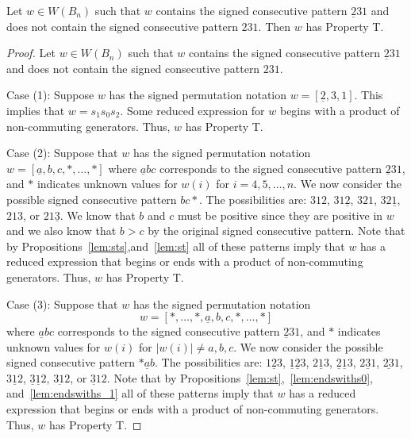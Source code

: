 \begin{proposition}\label{lem:231}
Let $w \in W(B_n)$ such that $w$ contains the signed consecutive pattern $\underline{2}31$ and does not contain the signed consecutive pattern $231$. Then $w$ has Property T.
\begin{proof}
	Let $w \in W(B_n)$ such that $w$ contains the signed consecutive pattern $\underline{2}31$ and does not contain the signed consecutive pattern $231$.
	
	Case (1): Suppose $w$ has the signed permutation notation $w=[\underline{2},3,1]$. This implies that $w=s_1s_0s_2$. Some reduced expression for $w$ begins with a product of non-commuting generators. Thus, $w$ has Property T.
	
	Case (2): Suppose that $w$ has the signed permutation notation $w=[\underline{a},b,c, \ast, \ldots, \ast]$ where $\underline{a}bc$ corresponds to the signed consecutive pattern $\underline{2}31$, and $\ast$ indicates unknown values for $w(i)$ for $i=4,5, \ldots, n$. We now consider the possible signed consecutive pattern $bc \ast$. The possibilities are: $312$, $31\underline{2}$, $321$, $32\underline{1}$, $213$, or $21\underline{3}$. We know that $b$ and $c$ must be positive since they are positive in $w$ and we also know that $b>c$ by the original signed consecutive pattern. Note that by Propositions~\ref{lem:sts},and~\ref{lem:st} all of these patterns imply that $w$ has a reduced expression that begins or ends with a product of non-commuting generators. Thus, $w$ has Property T.
	
	Case (3): Suppose that $w$ has the signed permutation notation 
	\[w=[\ast, \ldots, \ast, \underline{a},b,c, \ast, \ldots, \ast]\] where $\underline{a}bc$ corresponds to the signed consecutive pattern $\underline{2}31$, and $\ast$ indicates unknown values for $w(i)$ for $|w(i)|\neq a,b,c$. We now consider the possible signed consecutive pattern $\ast \underline{a}b$. The possibilities are: $1 \underline{2} 3$, $\underline{1} \underline{2}3$, $2 \underline{1} 3$, $\underline{2} \underline{1} 3$, $2 \underline{3}1$, $\underline{23}1$, $3 \underline{1} 2$, $\underline{3} \underline{1} 2$, $3 \underbar{1}2$, or $\underbar{31}2$. Note that by Propositions~\ref{lem:st},~\ref{lem:endswiths0}, and~\ref{lem:endswiths_1} all of these patterns imply that $w$ has a reduced expression that begins or ends with a product of non-commuting generators. Thus, $w$ has Property T. 
%	
\end{proof}	
\end{proposition}

